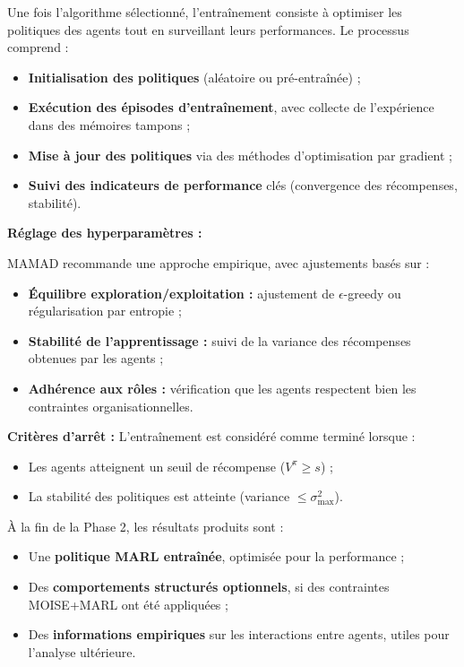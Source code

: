 Une fois l'algorithme sélectionné, l'entraînement consiste à optimiser les politiques des agents tout en surveillant leurs performances. Le processus comprend :

\begin{itemize}
    \item \textbf{Initialisation des politiques} (aléatoire ou pré-entraînée) ;
    \item \textbf{Exécution des épisodes d'entraînement}, avec collecte de l'expérience dans des mémoires tampons ;
    \item \textbf{Mise à jour des politiques} via des méthodes d'optimisation par gradient ;
    \item \textbf{Suivi des indicateurs de performance} clés (convergence des récompenses, stabilité).
\end{itemize}

\vspace{0.4em}
\noindent \textbf{Réglage des hyperparamètres :}

MAMAD recommande une approche empirique, avec ajustements basés sur :

\begin{itemize}
    \item \textbf{Équilibre exploration/exploitation :} ajustement de $\epsilon$-greedy ou régularisation par entropie ;
    \item \textbf{Stabilité de l'apprentissage :} suivi de la variance des récompenses obtenues par les agents ;
    \item \textbf{Adhérence aux rôles :} vérification que les agents respectent bien les contraintes organisationnelles.
\end{itemize}

\vspace{0.4em}
\noindent \textbf{Critères d'arrêt :}
L'entraînement est considéré comme terminé lorsque :

\begin{itemize}
    \item Les agents atteignent un seuil de récompense ($V^{\pi} \geq s$) ;
    \item La stabilité des politiques est atteinte (variance $\leq \sigma_{\max}^2$).
\end{itemize}

\vspace{0.4em}
\noindent À la fin de la Phase 2, les résultats produits sont :
\begin{itemize}
    \item Une \textbf{politique MARL entraînée}, optimisée pour la performance ;
    \item Des \textbf{comportements structurés optionnels}, si des contraintes MOISE+MARL ont été appliquées ;
    \item Des \textbf{informations empiriques} sur les interactions entre agents, utiles pour l'analyse ultérieure.
\end{itemize}


